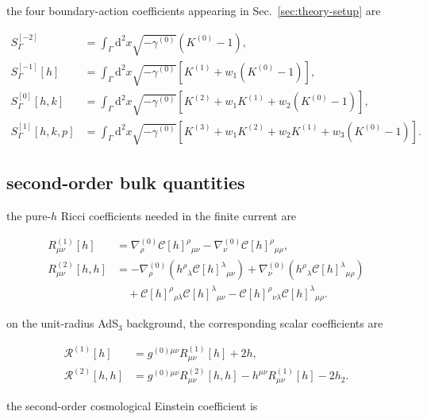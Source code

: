the four boundary-action coefficients appearing in Sec.~\ref{sec:theory-setup} are

\[\begin{aligned}
S_{\Gamma}^{[-2]} & =\int _{\Gamma}\mathrm{d}^{2}x\sqrt{-\gamma ^{(0)}}\left(K^{(0)}-1\right), \\
S_{\Gamma}^{[-1]}[h] & =\int _{\Gamma}\mathrm{d}^{2}x\sqrt{-\gamma ^{(0)}}\left[K^{(1)}+w_{1}\left(K^{(0)}-1\right)\right], \\
S_{\Gamma}^{[0]}[h,k] & =\int _{\Gamma}\mathrm{d}^{2}x\sqrt{-\gamma ^{(0)}}\left[K^{(2)}+w_{1}K^{(1)}+w_{2}\left(K^{(0)}-1\right)\right], \\
S_{\Gamma}^{[1]}[h,k,p] & =\int _{\Gamma}\mathrm{d}^{2}x\sqrt{-\gamma ^{(0)}}\left[K^{(3)}+w_{1}K^{(2)}+w_{2}K^{(1)}+w_{3}\left(K^{(0)}-1\right)\right].
\end{aligned}\]

\subsection{second-order bulk quantities}\label{subsec:second-order-bulk-quantities}

the pure-$\displaystyle{h}$ Ricci coefficients needed in the finite current are

\[\begin{aligned}
R_{\mu \nu}^{(1)}[h] & =\nabla ^{(0)}_{\rho}\mathscr{C}[h]^{\rho}{}_{\mu \nu}-\nabla ^{(0)}_{\nu}\mathscr{C}[h]^{\rho}{}_{\mu \rho}, \\
R_{\mu \nu}^{(2)}[h,h] & =-\nabla ^{(0)}_{\rho}\left(h^{\rho}{}_{\lambda}\mathscr{C}[h]^{\lambda}{}_{\mu \nu}\right)+\nabla ^{(0)}_{\nu}\left(h^{\rho}{}_{\lambda}\mathscr{C}[h]^{\lambda}{}_{\mu \rho}\right) \\
&\quad+\mathscr{C}[h]^{\rho}{}_{\rho \lambda}\mathscr{C}[h]^{\lambda}{}_{\mu \nu}-\mathscr{C}[h]^{\rho}{}_{\nu \lambda}\mathscr{C}[h]^{\lambda}{}_{\mu \rho}.
\end{aligned}\]

on the unit-radius AdS$\displaystyle{_{3}}$ background, the corresponding scalar coefficients are

\[\begin{aligned}
\mathcal{R}^{(1)}[h] & =g^{(0)\mu \nu}R_{\mu \nu}^{(1)}[h]+2h, \\
\mathcal{R}^{(2)}[h,h] & =g^{(0)\mu \nu}R_{\mu \nu}^{(2)}[h,h]-h^{\mu \nu}R_{\mu \nu}^{(1)}[h]-2h_{2}.
\end{aligned}\]

the second-order cosmological Einstein coefficient is

